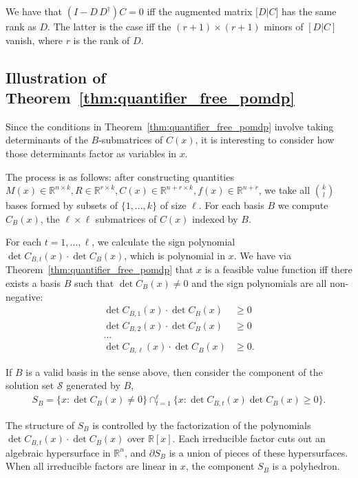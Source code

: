 \documentclass{article}
\theoremstyle{definition}
\theoremstyle{remark}
\begin{document}
We have that $(I - D\,D^\dagger)C = 0$ iff the augmented matrix \(\bigl[D  |  C\bigr]\) has the same rank as $D$. The latter is the case iff the $(r+1)\times(r+1)$ minors of $[D | C ]$ vanish, where $r$ is the rank of $D$. 




\subsection{Illustration of Theorem~\ref{thm:quantifier_free_pomdp}} 
\label{subsec:theorem_4.4_example}

Since the conditions in Theorem~\ref{thm:quantifier_free_pomdp} involve taking determinants of the $B$-submatrices of $C(x)$, it is interesting to consider how those determinants factor as variables in $x$.

The process is as follows: after constructing quantities $M(x) \in \mathbb{R}^{n\times k}, R \in \mathbb{R}^{r \times k}, C(x) \in \mathbb{R}^{n+r \times k}, f(x) \in \mathbb{R}^{n+r}$, we take all $k \choose l$ bases formed by subsets of $\{1, \dots, k\}$ of size $\ell$. For each basis $B$ we compute $C_B(x)$, the $\ell \times \ell$ submatrices of $C(x)$ indexed by $B$. 

For each $t = 1, \dots, \ell$, we calculate the sign polynomial $\det C_{B,t}(x) \cdot \det C_B(x)$, which is polynomial in $x$. We have via Theorem~\ref{thm:quantifier_free_pomdp} that $x$ is a feasible value function iff there exists a basis $B$ such that $\det C_B(x) \neq 0$ and the sign polynomials are all non-negative:
\begin{align*}
    \det C_{B,1}(x) \cdot \det C_B(x) &\geq 0\\
    \det C_{B,2}(x) \cdot \det C_B(x) &\geq 0\\
    \dots& \\
    \det C_{B,\ell}(x) \cdot \det C_B(x) &\geq 0.
\end{align*}

If $B$ is a valid basis in the sense above, then consider the component of the solution set $\mathcal{S}$ generated by $B$, 
\begin{align*}
    S_B = \{x: \det C_B(x) \neq 0 \} \cap_{t=1}^\ell \{ x: \det C_{B, t}(x)\det C_B(x) \geq 0 \}.
\end{align*}

The structure of $S_B$ is controlled by the factorization of the polynomials $\det C_{B,t}(x) \cdot \det C_B(x)$ over $\mathbb{R}[x]$. Each irreducible factor cuts out an algebraic hypersurface in $\mathbb{R}^n$, and $\partial S_B$ is a union of pieces of these hypersurfaces. When all irreducible factors are linear in $x$, the component $S_B$ is a polyhedron.
\end{document}
